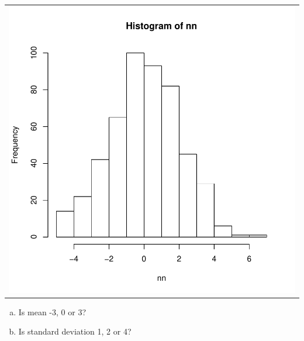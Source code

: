 \documentclass{article}
\begin{document}
\begin{itemize}
\begin{tabular}{c}
{\includegraphics{exam1-002}
}
\end{tabular}

\begin{enumerate}[(a)]
\item Is mean -3, 0 or 3? 
\vspace{\baselineskip}\item Is standard deviation 1, 2 or 4? 
\vspace{\baselineskip}\end{enumerate}
\end{itemize}
{\bf  }\newpage
\end{document}
